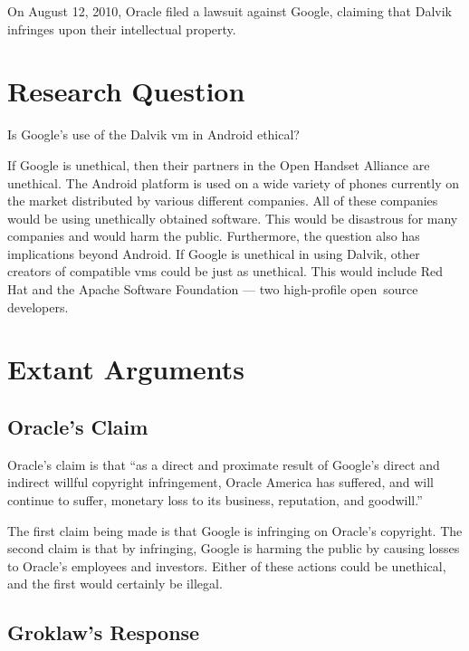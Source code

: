\documentclass[11pt]{article}
\begin{document}
\begin{multicols}{2}
On August 12, 2010, Oracle filed a lawsuit against Google, claiming that Dalvik
infringes upon their intellectual property. \cite[Count VIII]{oracle-lawsuit}


\section{Research Question} %
\label{sec:question}

Is Google's use of the Dalvik \gls{vm} in Android ethical?

If Google is unethical, then their partners in the Open Handset Alliance are
unethical.  The Android platform is used on a wide variety of phones currently
on the market distributed by various different companies.  All of these
companies would be using unethically obtained software.  This would be
disastrous for many companies and would harm the public.  Furthermore, the
question also has implications beyond Android.  If Google is unethical in using
Dalvik, other creators of compatible \glspl{vm} could be just as unethical.
This would include Red Hat and the Apache Software Foundation --- two
high-profile open~source developers.


\section{Extant Arguments} %
\label{sec:args}

\subsection{Oracle's Claim} %
\label{sub:args_oracle}

Oracle's claim is that ``as a direct and proximate result of Google's direct
and indirect willful copyright infringement, Oracle America has suffered, and
will continue to suffer, monetary loss to its business, reputation, and
goodwill.'' \cite[p.~9 line 11]{oracle-lawsuit}

The first claim being made is that Google is infringing on Oracle's copyright.
The second claim is that by infringing, Google is harming the public by causing
losses to Oracle's employees and investors.  Either of these actions could be
unethical, and the first would certainly be illegal.


\subsection{Groklaw's Response} %
\label{sub:args_groklaw}


\end{multicols}
\end{document}
